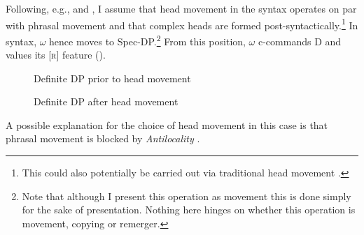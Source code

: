 \documentclass[output=paper]{langscibook}
\begin{document}
Following, e.g., \citet{Matushanski:2006ud} and \citet{Harizanov:2018ep}, I assume that head movement in the syntax operates on par with phrasal movement and that complex heads are formed post-syntactically.\footnote{This could also potentially be carried out via traditional head movement \citep[cf.][]{Hardarson:2016wd}.} In syntax, $\omega$ hence moves to Spec-DP.\footnote{Note that although I present this operation as movement this is done simply for the sake of presentation. Nothing here hinges on whether this operation is movement, copying or remerger.} From this position, $\omega$ c-commands D and values its [\textsc{r}] feature ().

\begin{figure}
\captionsetup{margin=.05\linewidth}
\begin{floatrow}
	{\caption{Definite DP prior to head movement}\label{hardarsonPatIIIbase}}
	{\caption{Definite DP after head movement}\label{hardarsonNtoD}}
\end{floatrow}
\end{figure}

A possible explanation for the choice of head movement in this case is that phrasal movement is blocked by \textit{Antilocality} \citep[e.g.,][]{Grohmann:2000td,abels2003}.
\end{document}
